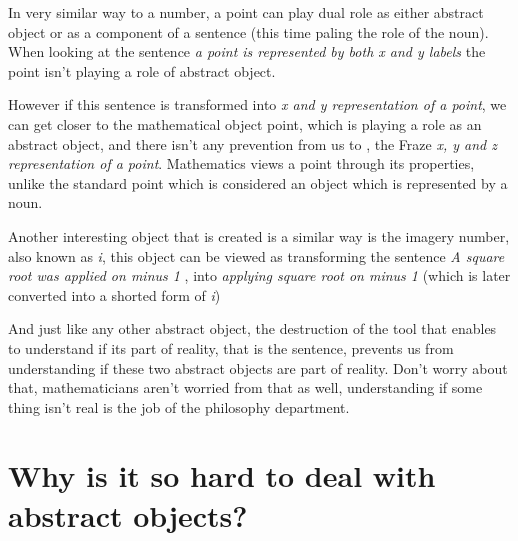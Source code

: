 \documentclass[10pt]{article}
\begin{document}
 In very similar way to a number, a point  can play dual role as either abstract object or as a component of a sentence (this time paling the role of the noun). When looking at the sentence \textit{a point is represented by  both x and y labels} the point isn’t playing a role of abstract object.\par
However if this sentence is transformed into \textit{x and y representation of a point}, we can get closer to the mathematical object point, which is playing a role as an abstract object, and there isn’t any prevention from us to , the Fraze \textit{x, y and z representation of a point}. Mathematics views a point through its properties, unlike the standard point which is considered an object which is represented by a noun.\par
Another interesting object that is created is a similar way is the imagery number, also known as \textit{i}, this object can be viewed as transforming the sentence \textit{A square root was applied on minus 1} , into \textit{applying  square root  on minus 1} (which is later converted into a shorted form of \textit{i})\par
And just like any other abstract object, the destruction of the tool that enables to understand if its part of reality, that is the sentence, prevents us from understanding if these two abstract objects are part of reality. Don’t worry about that, mathematicians aren't worried from that as well, understanding if some thing isn’t real is the job of the philosophy department.

\newpage 
\section*{Why is it so hard to deal with abstract objects?}
\end{document}
